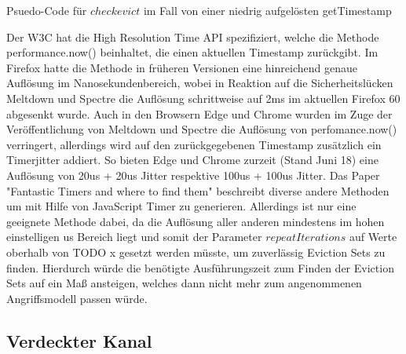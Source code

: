 \begin{algorithm}[h]
\DontPrintSemicolon
\caption{Psuedo-Code für $checkevict$ im Fall von einer niedrig aufgelösten getTimestamp}
\label{alg:checkevict_low_resolution}


\end{algorithm}

Der W3C hat die High Resolution Time API spezifiziert, welche die Methode performance.now() beinhaltet, die einen aktuellen Timestamp zurückgibt. Im Firefox hatte die Methode in früheren Versionen eine hinreichend genaue Auflösung im Nanosekundenbereich, wobei in Reaktion auf die Sicherheitslücken Meltdown und Spectre die Auflösung schrittweise auf 2ms im aktuellen Firefox 60 abgesenkt wurde. Auch in den Browsern Edge und Chrome wurden im Zuge der Veröffentlichung von Meltdown und Spectre die Auflösung von perfomance.now() verringert, allerdings wird auf den zurückgegebenen Timestamp zusätzlich ein Timerjitter addiert. So bieten Edge und Chrome zurzeit (Stand Juni 18) eine Auflösung von 20us + 20us Jitter respektive 100us + 100us Jitter.
Das Paper "Fantastic Timers and where to find them" beschreibt diverse andere Methoden um mit Hilfe von JavaScript Timer zu generieren. Allerdings ist nur eine geeignete Methode dabei, da die Auflösung aller anderen mindestens im hohen einstelligen us Bereich liegt und somit der Parameter $repeatIterations$ auf Werte oberhalb von TODO x gesetzt werden müsste, um zuverlässig Eviction Sets zu finden. Hierdurch würde die benötigte Ausführungszeit zum Finden der Eviction Sets auf ein Maß ansteigen, welches dann nicht mehr zum angenommenen Angriffsmodell passen würde.

\subsection{Verdeckter Kanal}

